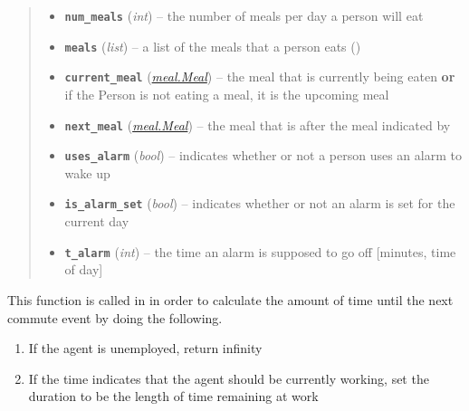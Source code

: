 \documentclass[letterpaper,10pt,english]{sphinxmanual}
\begin{document}
\begin{fulllineitems}
\begin{quote}
\begin{description}
\begin{itemize}
\item {} 
\textbf{\texttt{num\_meals}} (\emph{int}) -- the number of meals per day a person will eat

\item {} 
\textbf{\texttt{meals}} (\emph{list}) -- a list of the meals that a person eats ({\hyperref[meal:meal.Meal]{\emph{}}})

\item {} 
\textbf{\texttt{current\_meal}} ({\hyperref[meal:meal.Meal]{\emph{\emph{meal.Meal}}}}) -- the meal that is currently being eaten \textbf{or} if the Person is not eating a meal,     it is the upcoming meal

\item {} 
\textbf{\texttt{next\_meal}} ({\hyperref[meal:meal.Meal]{\emph{\emph{meal.Meal}}}}) -- the meal that is after the meal indicated by 

\item {} 
\textbf{\texttt{uses\_alarm}} (\emph{bool}) -- indicates whether or not a person uses an alarm to wake up

\item {} 
\textbf{\texttt{is\_alarm\_set}} (\emph{bool}) -- indicates whether or not an alarm is set for the current day

\item {} 
\textbf{\texttt{t\_alarm}} (\emph{int}) -- the time an alarm is supposed to go off {[}minutes, time of day{]}

\end{itemize}

\end{description}\end{quote}

\begin{fulllineitems}
\label{social:social.Social.duration_to_next_commute_event}
This function is called in in order to calculate the amount of time until the next commute event by         doing the following.
\begin{enumerate}
\item {} 
If the agent is unemployed, return infinity

\item {} 
If the time indicates that the agent should be currently working, set the duration to be the         length of time remaining at work


\end{enumerate}
\end{fulllineitems}
\end{fulllineitems}
\end{document}
